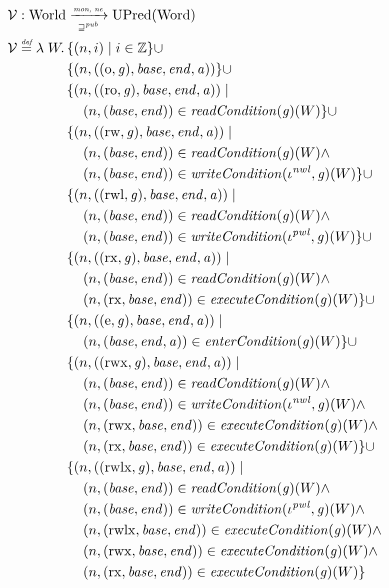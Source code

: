 \documentclass[a4paper]{article}
\newcommand{\defeq}{\stackrel{\textit{\tiny{def}}}{=}}
\newcommand{\union}{\mathbin{\cup}}
\newcommand{\var}[1]{\mathit{#1}}
\newcommand{\gl}{\var{g}}
\newcommand{\addr}{\var{a}}
\newcommand{\start}{\var{base}}
\newcommand{\addrend}{\var{end}}
\newcommand{\perm}{\var{perm}}
\newcommand{\stdcap}[1][(\perm,\gl)]{\left(#1,\start,\addrend,\addr \right)}
\newcommand{\nwl}{\var{nwl}}
\newcommand{\pwl}{\var{pwl}}
\newcommand{\plainfun}[2]{
  \ifthenelse{\equal{#2}{}}
  {\mathit{#1}}
  {\mathit{#1}(#2)}
}
\newcommand{\readCond}[1]{\plainfun{readCondition}{#1}}
\newcommand{\writeCond}[1]{\plainfun{writeCondition}{#1}}
\newcommand{\execCond}[1]{\plainfun{executeCondition}{#1}}
\newcommand{\entryCond}[1]{\plainfun{enterCondition}{#1}}
\newcommand{\futurewk}{\mathbin{\sqsupseteq}^{\var{pub}}}
\newcommand{\monwknefun}{\xrightarrow[\text{\tiny{$\futurewk$}}]{\textit{\tiny{mon, ne}}}}
\newcommand{\asmType}{\plaindom{AsmType}}
\newcommand{\plaindom}[1]{\mathrm{#1}}
\newcommand{\Words}{\plaindom{Word}}
\newcommand{\ints}{\mathbb{Z}}
\newcommand{\Worlds}{\plaindom{World}}
\newcommand{\UPred}[1]{\plaindom{UPred}(#1)}
\newcommand{\intr}[2]{\mathcal{#1}}
\newcommand{\valueintr}[1]{\intr{V}{#1}}
\newcommand{\stdvr}{\valueintr{\asmType}}
\newcommand{\npair}[2][n]{\left(#1,#2 \right)}
\newcommand{\plainperm}[1]{\mathrm{#1}}
\newcommand{\noperm}{\plainperm{o}}
\newcommand{\readonly}{\plainperm{ro}}
\newcommand{\readwrite}{\plainperm{rw}}
\newcommand{\exec}{\plainperm{rx}}
\newcommand{\entry}{\plainperm{e}}
\newcommand{\rwx}{\plainperm{rwx}}
\newcommand{\readwritel}{\plainperm{rwl}}
\newcommand{\rwlx}{\plainperm{rwlx}}
\begin{document}
\begin{align*}
  &\stdvr : \Worlds \monwknefun \UPred{\Words} \\
  &\stdvr\defeq \lambda \; W \ldotp 
    \begin{aligned}[t]
      & \{ \npair{i} \mid i \in \ints \} 
      \union \\
      & \{ \npair{\stdcap[(\noperm,\gl)] }  \} 
      \union \\
      & \{ \npair{\stdcap[(\readonly,\gl)] } \mid \\
      & \quad \npair{(\start,\addrend)} \in \readCond{}(\gl)(W)\} 
      \union \\
      & \{ \npair{\stdcap[(\readwrite,\gl)] } \mid \\
      & \quad \npair{(\start,\addrend)} \in \readCond{}(\gl)(W) \land \\
      & \quad \npair{(\start,\addrend)} \in \writeCond{}(\iota^\nwl,\gl)(W) \}
      \union \\
      & \{ \npair{\stdcap[(\readwritel,\gl)] } \mid \\
      & \quad \npair{(\start,\addrend)} \in \readCond{}(\gl)(W) \land \\
      & \quad \npair{(\start,\addrend)} \in \writeCond{}(\iota^\pwl,\gl)(W) \}
      \union \\
      & \{ \npair{\stdcap[(\exec,\gl)]} \mid \\
      & \quad \npair{(\start,\addrend)} \in \readCond{}(\gl)(W) \land \\
      & \quad \npair{(\exec,\start,\addrend)} \in \execCond{}(\gl)(W) \} 
      \union \\
      & \{ \npair{\stdcap[(\entry,\gl)]} \mid \\
      & \quad \npair{(\start,\addrend,\addr)} \in \entryCond{}(\gl)(W)\} 
      \union \\
      & \{ \npair{\stdcap[(\rwx,\gl)]} \mid \\
      & \quad \npair{(\start,\addrend)} \in \readCond{}(\gl)(W) \land \\
      & \quad \npair{(\start,\addrend)} \in \writeCond{}(\iota^\nwl,\gl)(W) \land\\
      & \quad \npair{(\rwx,\start,\addrend)} \in \execCond{}(\gl)(W)  \land \\
      & \quad \npair{(\exec,\start,\addrend)} \in \execCond{}(\gl)(W) \}
      \union \\
      & \{ \npair{\stdcap[(\rwlx,\gl)]} \mid \\
      & \quad \npair{(\start,\addrend)} \in \readCond{}(\gl)(W) \land \\
      & \quad \npair{(\start,\addrend)} \in \writeCond{}(\iota^\pwl,\gl)(W) \land\\
      & \quad \npair{(\rwlx,\start,\addrend)} \in \execCond{}(\gl)(W) \land \\
      & \quad \npair{(\rwx,\start,\addrend)} \in \execCond{}(\gl)(W) \land \\
      & \quad \npair{(\exec,\start,\addrend)} \in \execCond{}(\gl)(W) \}
    \end{aligned}
\end{align*}
\end{document}
